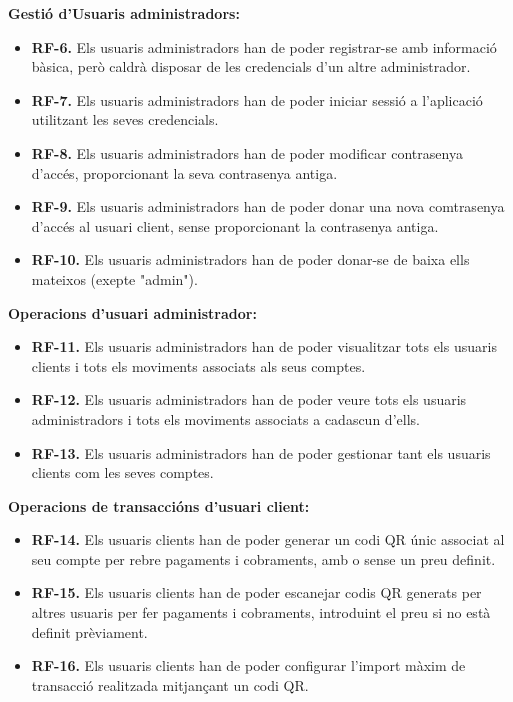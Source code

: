 \documentclass[a4paper,12pt,twoside]{ThesisStyle}
\begin{document}
\textbf{Gestió d'Usuaris administradors:}
\begin{itemize}
    \item \textbf{RF-6.} Els usuaris administradors han de poder registrar-se amb informació bàsica, però caldrà disposar de les credencials d'un altre administrador.
    \item \textbf{RF-7.} Els usuaris administradors han de poder iniciar sessió a l'aplicació utilitzant les seves credencials.
    \item \textbf{RF-8.} Els usuaris administradors han de poder modificar contrasenya d'accés, proporcionant la seva contrasenya antiga.
    \item \textbf{RF-9.} Els usuaris administradors han de poder donar una nova comtrasenya d'accés al usuari client, sense proporcionant la contrasenya antiga.
    \item \textbf{RF-10.} Els usuaris administradors han de poder donar-se de baixa ells mateixos (exepte "admin").
\end{itemize}


\textbf{Operacions d'usuari administrador:}
\begin{itemize}
    \item \textbf{RF-11.} Els usuaris administradors han de poder visualitzar tots els usuaris clients i tots els moviments associats als seus comptes.
    \item \textbf{RF-12.} Els usuaris administradors han de poder veure tots els usuaris administradors i tots els moviments associats a cadascun d'ells.
    \item \textbf{RF-13.} Els usuaris administradors han de poder gestionar tant els usuaris clients com les seves comptes.
\end{itemize}


\textbf{Operacions de transaccións d'usuari client:}
\begin{itemize}
    \item \textbf{RF-14.} Els usuaris clients han de poder generar un codi QR únic associat al seu compte per rebre pagaments i cobraments, amb o sense un preu definit.
    \item \textbf{RF-15.} Els usuaris clients han de poder escanejar codis QR generats per altres usuaris per fer pagaments i cobraments, introduint el preu si no està definit prèviament.
    \item \textbf{RF-16.} Els usuaris clients han de poder configurar l'import màxim de transacció realitzada mitjançant un codi QR.

\end{itemize}
\end{document}
